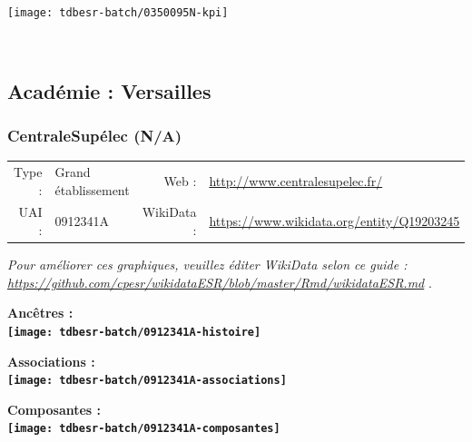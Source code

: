 \documentclass[12pt,french,]{article}
\begin{document}
\begin{center}\texttt{[image: tdbesr-batch/0350095N-kpi]} \end{center}\checkoddpage

\ifoddpage \fi ~\newpage  

\hypertarget{acaduxe9mie-versailles-1}{%
\subsection{Académie : Versailles}\label{acaduxe9mie-versailles-1}}

\hypertarget{centralesupuxe9lec-na}{%
\subsubsection{CentraleSupélec (N/A)}\label{centralesupuxe9lec-na}}

\begin{tabular*}{\textwidth}{rp{5cm}rl}  
\hline  
Type : & Grand établissement & Web : &\href{http://www.centralesupelec.fr/}{http://www.centralesupelec.fr/} \\  
UAI : & 0912341A & WikiData : & \href{https://www.wikidata.org/entity/Q19203245}{https://www.wikidata.org/entity/Q19203245} \\  
\hline  
\end{tabular*}

\textit{\scriptsize Pour améliorer ces graphiques, veuillez éditer WikiData selon ce guide :  \href{https://github.com/cpesr/wikidataESR/blob/master/Rmd/wikidataESR.md}{https://github.com/cpesr/wikidataESR/blob/master/Rmd/wikidataESR.md}}
.

\vspace{1cm}  
\begin{minipage}[b]{0.50\textwidth}\begin{center} \bf Ancêtres : \\  
\texttt{[image: tdbesr-batch/0912341A-histoire]} \end{center}\end{minipage}\begin{minipage}[b]{0.50\textwidth}\begin{center} \bf Associations : \\  
\texttt{[image: tdbesr-batch/0912341A-associations]} \end{center}\end{minipage}

\hrulefill

\begin{center} \bf Composantes : \\  
\texttt{[image: tdbesr-batch/0912341A-composantes]} \end{center}
\end{document}
